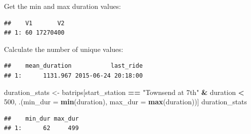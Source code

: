 \documentclass[]{book}
\newenvironment{Shaded}{\begin{snugshade}}{\end{snugshade}}
\newcommand{\DataTypeTok}[1]{\textcolor[rgb]{0.13,0.29,0.53}{#1}}
\newcommand{\DecValTok}[1]{\textcolor[rgb]{0.00,0.00,0.81}{#1}}
\newcommand{\KeywordTok}[1]{\textcolor[rgb]{0.13,0.29,0.53}{\textbf{#1}}}
\newcommand{\NormalTok}[1]{#1}
\newcommand{\OperatorTok}[1]{\textcolor[rgb]{0.81,0.36,0.00}{\textbf{#1}}}
\newcommand{\StringTok}[1]{\textcolor[rgb]{0.31,0.60,0.02}{#1}}
\begin{document}
Get the min and max duration values:

\begin{Shaded}
\end{Shaded}

\begin{verbatim}
##    V1       V2
## 1: 60 17270400
\end{verbatim}

Calculate the number of unique values:

\begin{Shaded}
\end{Shaded}

\begin{verbatim}
##    mean_duration           last_ride
## 1:      1131.967 2015-06-24 20:18:00
\end{verbatim}

\begin{Shaded}
\begin{Highlighting}[]
\NormalTok{duration_stats <-}\StringTok{ }\NormalTok{batrips[start_station }\OperatorTok{==}\StringTok{ "Townsend at 7th"} \OperatorTok{&}\StringTok{ }\NormalTok{duration }\OperatorTok{<}\StringTok{ }\DecValTok{500}\NormalTok{, }
\NormalTok{                          .(}\DataTypeTok{min_dur =} \KeywordTok{min}\NormalTok{(duration), }
                            \DataTypeTok{max_dur =} \KeywordTok{max}\NormalTok{(duration))]}
\NormalTok{duration_stats}
\end{Highlighting}
\end{Shaded}

\begin{verbatim}
##    min_dur max_dur
## 1:      62     499
\end{verbatim}
\end{document}
